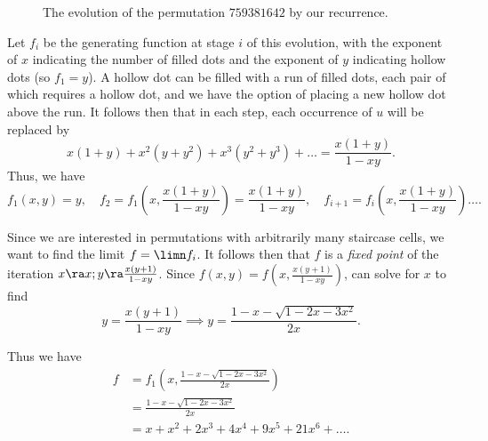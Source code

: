 \documentclass[12pt,twoside]{memoir}
\begin{document}
\begin{figure}[t]
        \caption{The evolution of the permutation $759381642$ by our recurrence.}
        \label{involutions:fig:perm-iteration}
      \end{figure}

      Let $f_i$ be the generating function at stage $i$ of this evolution, with the
      exponent of $x$ indicating the number of filled dots and the exponent of
      $y$ indicating hollow dots (so $f_1 = y$). A hollow dot can be filled with
      a run of filled dots, each pair of which requires a hollow dot, and we have
      the option of placing a new hollow dot above the run. It follows then that
      in each step, each occurrence of $u$ will be replaced by 
      $$ x(1+y) + x^2(y+y^2) + x^3 (y^2 + y^3) + \dots = \frac{x(1+y)}{1-xy}. $$ 
      Thus, we have
      {\small
      $$ f_1(x,y) = y, \quad f_2 
        = f_1\left(x, \frac{x(1+y)}{1-xy}\right) = \frac{x(1+y)}{1 - xy}, \quad 
        f_{i+1} = f_i\left(x, \frac{x(1+y)}{1-xy}\right) \dots .$$
      }

      Since we are interested in permutations with arbitrarily many staircase
      cells, we want to find the limit $f = \limn f_i $. It follows then that $f$
      is a \emph{fixed point} of the iteration $x \ra x; y \ra \frac{x(y+1)}{1 -
      xy}$. Since $f(x,y) = f\left(x, \frac{x(y+1)}{1 - xy}\right)$, can solve
      for $x$ to find
      $$ y = \frac{x(y+1)}{1 - xy} \implies 
         y = \frac{1 - x - \sqrt{1 - 2x - 3x^2}}{2x}.$$

      Thus we have
      $$ \begin{aligned}
        f &= f_1\left(x,\frac{1 - x - \sqrt{1 - 2x - 3x^2}}{2x}\right)\\
          &= \frac{1 - x - \sqrt{1 - 2x - 3x^2}}{2x} \\
          &= x + x^2 + 2x^3 + 4x^4 + 9x^5 + 21x^6 + \dots.
      \end{aligned} $$
\end{document}

